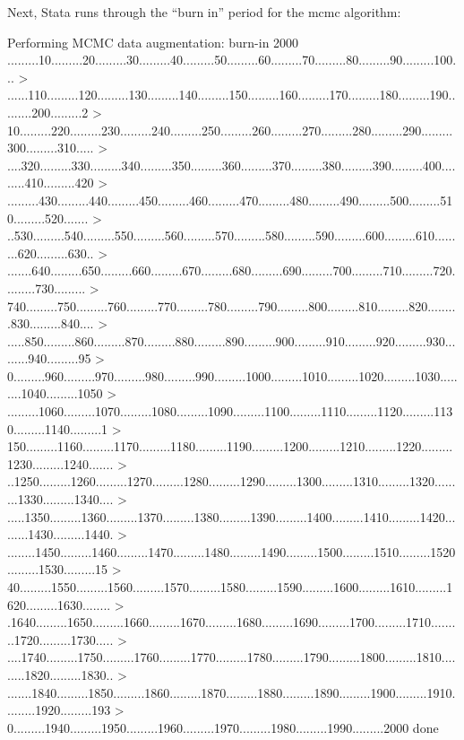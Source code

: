 \documentclass[12 pt]{article}
\begin{document}
Next, Stata runs through the ``burn in'' period for the mcmc
algorithm:

\begin{stlog}
  Performing MCMC data augmentation: 
  burn-in 2000 .........10.........20.........30.........40.........50.........60.........70.........80.........90.........100...
> ......110.........120.........130.........140.........150.........160.........170.........180.........190.........200.........2
> 10.........220.........230.........240.........250.........260.........270.........280.........290.........300.........310.....
> ....320.........330.........340.........350.........360.........370.........380.........390.........400.........410.........420
> .........430.........440.........450.........460.........470.........480.........490.........500.........510.........520.......
> ..530.........540.........550.........560.........570.........580.........590.........600.........610.........620.........630..
> .......640.........650.........660.........670.........680.........690.........700.........710.........720.........730.........
> 740.........750.........760.........770.........780.........790.........800.........810.........820.........830.........840....
> .....850.........860.........870.........880.........890.........900.........910.........920.........930.........940.........95
> 0.........960.........970.........980.........990.........1000.........1010.........1020.........1030.........1040.........1050
> .........1060.........1070.........1080.........1090.........1100.........1110.........1120.........1130.........1140.........1
> 150.........1160.........1170.........1180.........1190.........1200.........1210.........1220.........1230.........1240.......
> ..1250.........1260.........1270.........1280.........1290.........1300.........1310.........1320.........1330.........1340....
> .....1350.........1360.........1370.........1380.........1390.........1400.........1410.........1420.........1430.........1440.
> ........1450.........1460.........1470.........1480.........1490.........1500.........1510.........1520.........1530.........15
> 40.........1550.........1560.........1570.........1580.........1590.........1600.........1610.........1620.........1630........
> .1640.........1650.........1660.........1670.........1680.........1690.........1700.........1710.........1720.........1730.....
> ....1740.........1750.........1760.........1770.........1780.........1790.........1800.........1810.........1820.........1830..
> .......1840.........1850.........1860.........1870.........1880.........1890.........1900.........1910.........1920.........193
> 0.........1940.........1950.........1960.........1970.........1980.........1990.........2000 done
\end{stlog}
\end{document}
